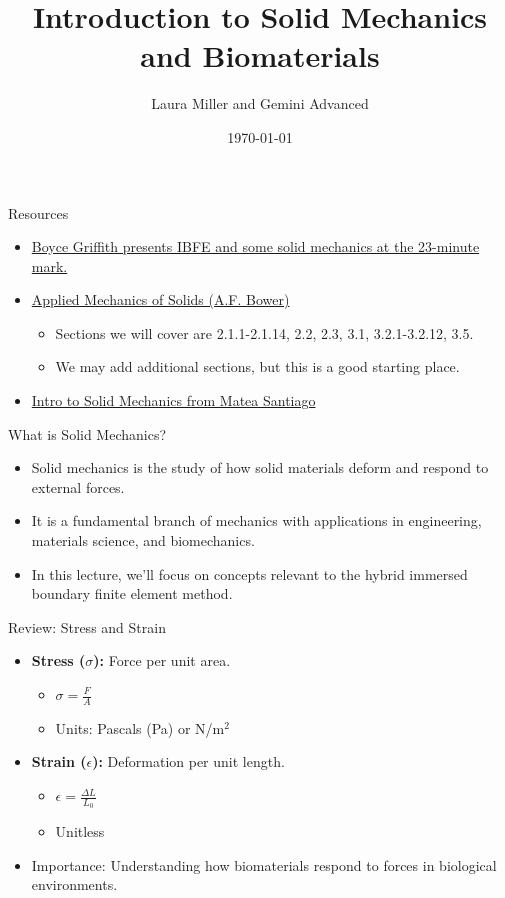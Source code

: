 \documentclass{beamer}
\title{Introduction to Solid Mechanics and Biomaterials}
\author{Laura Miller and Gemini Advanced}
\date{\today}
\begin{document}
\frame{\titlepage}

\begin{frame}{Resources}
  \begin{itemize}
    \item \href{https://www.youtube.com/watch?v=-1TlNJL93sc}{Boyce Griffith presents IBFE and some solid mechanics at the 23-minute mark.}
    \item \href{https://solidmechanics.org/contents.php}{Applied Mechanics of Solids (A.F. Bower)}
    \begin{itemize}
    \item Sections we will cover are 2.1.1-2.1.14, 2.2, 2.3, 3.1, 3.2.1-3.2.12, 3.5.
    \item We may add additional sections, but this is a good starting place.
    \end{itemize}
    \item \href{https://drive.google.com/drive/folders/1vkhrX0YInMm5pfUj3LcRA9TV0DZdFp1a?usp=sharing}{Intro to Solid Mechanics from Matea Santiago}    
  \end{itemize}
\end{frame}

\begin{frame}{What is Solid Mechanics?}
    \begin{itemize}
        \item Solid mechanics is the study of how solid materials deform and respond to external forces.
        \item It is a fundamental branch of mechanics with applications in engineering, materials science, and biomechanics.
        \item In this lecture, we'll focus on concepts relevant to the hybrid immersed boundary finite element method.
    \end{itemize}
\end{frame}

\begin{frame}{Review: Stress and Strain}
  \begin{itemize}
    \item \textbf{Stress ($\sigma$):} Force per unit area.
      \begin{itemize}
        \item $\sigma = \frac{F}{A}$
        \item Units: Pascals (Pa) or N/m$^2$
      \end{itemize}
    \item \textbf{Strain ($\epsilon$):} Deformation per unit length.
      \begin{itemize}
        \item $\epsilon = \frac{\Delta L}{L_0}$
        \item Unitless
      \end{itemize}
    \item Importance: Understanding how biomaterials respond to forces in biological environments.
  \end{itemize}
\end{frame}
\end{document}
